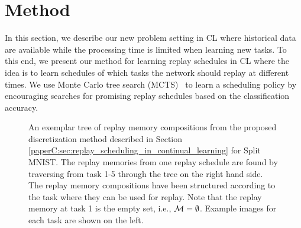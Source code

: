 
\section{Method}\label{paperC:sec:method}


In this section, we describe our new problem setting in CL where historical data are available while the processing time is limited when learning new tasks. To this end, we present our method for learning replay schedules in CL where the idea is to learn schedules of which tasks the network should replay at different times. 
We use Monte Carlo tree search (MCTS)~ to learn a scheduling policy by encouraging searches for promising replay schedules based on the classification accuracy. 



\begin{figure}[t]
\centering 
\setlength{\figwidth}{.77\textwidth}
\setlength{\figheight}{.3\textheight}

\vspace{-2mm}
\caption{An exemplar tree of replay memory compositions from the proposed discretization method described in Section \ref{paperC:sec:replay_scheduling_in_continual_learning} for Split MNIST. The replay memories from one replay schedule are found by traversing from task 1-5 through the tree on the right hand side. The replay memory compositions have been structured according to the task where they can be used for replay. Note that the replay memory at task 1 is the empty set, i.e., ${\mathcal{M}} = \emptyset$. Example images for each task are shown on the left.
}
\vspace{-3mm}
\label{fig:replay_scheduling_mcts_tree_example}
\end{figure}










